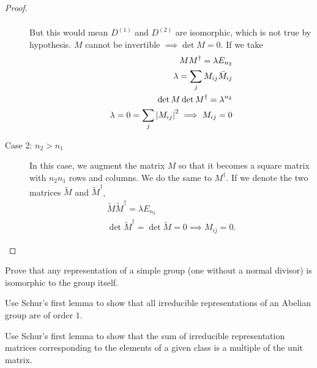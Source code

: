 \begin{proof}
\begin{description}
\begin{align}
    \end{align}
    But this would mean $D^{(1)}$ and $D^{(2)}$ are isomorphic, which is not true
    by hypothesis. $M$ cannot be invertible $\implies\det M=0$.
    If we take
    \begin{align}
        MM^\dagger=\lambda E_{n_2}\\
        \lambda=\sum_j M_{ij}\bar{M}_{ij}\\
        \det M\det M^\dagger=\lambda^{n_2}\\
        \lambda=0=\sum_j\abs{M_{ij}}^2\implies M_{ij}=0
    \end{align}
\item[Case 2: $n_2>n_1$]
    In this case, we augment the matrix $M$ so that it becomes a
    square matrix with $n_2n_1$ rows and columns. We do the same to $M^\dagger$.
    If we denote the two matrices $\widetilde{M}$ and $\widetilde{M}^\dagger$,
    \begin{align}
        \widetilde{M}\widetilde{M}^\dagger = \lambda E_{n_2}\\
        \det\widetilde{M}^\dagger=\det\widetilde{M}=0\implies M_{ij}=0.
    \end{align}
\end{description}
\end{proof}


\begin{exercise}
    Prove that any representation of a simple group (one without a normal divisor)
    is isomorphic to the group
    itself.
\end{exercise}

\begin{exercise}
    Use Schur's first lemma to show that all irreducible representations of an
    Abelian group are of order $1$.
\end{exercise}

\begin{exercise}
    Use Schur's first lemma to show that the sum of irreducible representation
    matrices corresponding to the elements of a given class is a multiple of the
    unit matrix.
\end{exercise}
